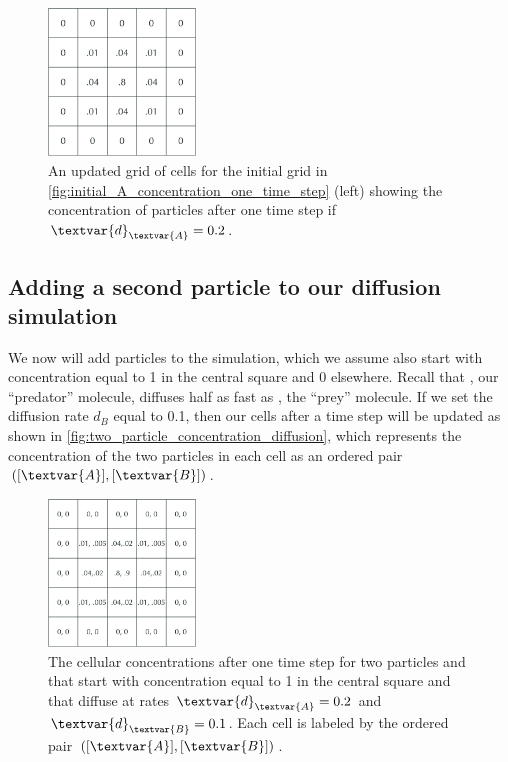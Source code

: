 \begin{figure}[h]
\centering
\mySfFamily
\includegraphics[width = 0.35\textwidth]{../images_CMYK/A_concentration_slower_diffusion}
\caption{An updated grid of cells for the initial grid in \autoref{fig:initial_A_concentration_one_time_step} (left) showing the concentration of  particles after one time step if $\textvar{d}_\textvar{A} = \text{0.2}$.}
\label{fig:A_concentration_slower_diffusion}
\end{figure}

\subsection{Adding a second particle to our diffusion simulation}

We now will add  particles to the simulation, which we assume also start with concentration equal to 1 in the central square and 0 elsewhere. Recall that , our ``predator'' molecule, diffuses half as fast as , the ``prey'' molecule. If we set the diffusion rate $d_B$ equal to 0.1, then our cells after a time step will be updated as shown in \autoref{fig:two_particle_concentration_diffusion}, which represents the concentration of the two particles in each cell as an ordered pair $([\textvar{A}], [\textvar{B}])$.\\

\begin{figure}[h]
\centering
\mySfFamily
\includegraphics[width = 0.35\textwidth]{../images_CMYK/two_particle_concentration_diffusion}
\caption{The cellular concentrations after one time step for two particles  and  that start with concentration equal to 1 in the central square and that diffuse at rates $\textvar{d}_\textvar{A} = \text{0.2}$ and $\textvar{d}_\textvar{B} = \text{0.1}$. Each cell is labeled by the ordered pair $([\textvar{A}], [\textvar{B}])$.}
\label{fig:two_particle_concentration_diffusion}
\end{figure}

